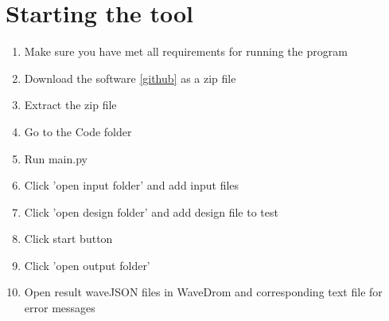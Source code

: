 \section{Starting the tool}
\begin{enumerate}
	\item 	Make sure you have met all requirements for running the program 
	\item Download the software \ref{github} as a zip file
	\item Extract the zip file
	\item Go to the Code folder
	\item Run main.py
	\item Click 'open input folder' and add input files
	\item Click 'open design folder' and add design file to test
	\item Click start button
	\item Click 'open output folder'
	\item Open result waveJSON files in WaveDrom and corresponding text file for error messages
\end{enumerate}

	

